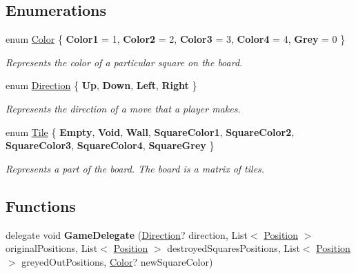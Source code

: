 \subsection*{Enumerations}
\begin{DoxyCompactItemize}
\item 
enum \hyperlink{namespace_pushy_squares_a456c990da0c8e2089c171d31f7e27574}{Color} \{ \newline
{\bfseries Color1} = 1, 
{\bfseries Color2} = 2, 
{\bfseries Color3} = 3, 
{\bfseries Color4} = 4, 
\newline
{\bfseries Grey} = 0
 \}\begin{DoxyCompactList}\small\item\em Represents the color of a particular square on the board. \end{DoxyCompactList}
\item 
enum \hyperlink{namespace_pushy_squares_acc0b0bbd9a5171048a288222e2a4d00b}{Direction} \{ {\bfseries Up}, 
{\bfseries Down}, 
{\bfseries Left}, 
{\bfseries Right}
 \}\begin{DoxyCompactList}\small\item\em Represents the direction of a move that a player makes. \end{DoxyCompactList}
\item 
enum \hyperlink{namespace_pushy_squares_a99b558ed55fb7c5c20e9fe37c652132c}{Tile} \{ \newline
{\bfseries Empty}, 
{\bfseries Void}, 
{\bfseries Wall}, 
{\bfseries Square\+Color1}, 
\newline
{\bfseries Square\+Color2}, 
{\bfseries Square\+Color3}, 
{\bfseries Square\+Color4}, 
{\bfseries Square\+Grey}
 \}\begin{DoxyCompactList}\small\item\em Represents a part of the board. The board is a matrix of tiles. \end{DoxyCompactList}
\end{DoxyCompactItemize}
\subsection*{Functions}
\begin{DoxyCompactItemize}
\item 
\mbox{\label{namespace_pushy_squares_a3ebf2fe7f6c3a2dabb69f9bcf460897b}} 
delegate void {\bfseries Game\+Delegate} (\hyperlink{namespace_pushy_squares_acc0b0bbd9a5171048a288222e2a4d00b}{Direction}? direction, List$<$ \hyperlink{struct_pushy_squares_1_1_position}{Position} $>$ original\+Positions, List$<$ \hyperlink{struct_pushy_squares_1_1_position}{Position} $>$ destroyed\+Squares\+Positions, List$<$ \hyperlink{struct_pushy_squares_1_1_position}{Position} $>$ greyed\+Out\+Positions, \hyperlink{namespace_pushy_squares_a456c990da0c8e2089c171d31f7e27574}{Color}? new\+Square\+Color)
\end{DoxyCompactItemize}


